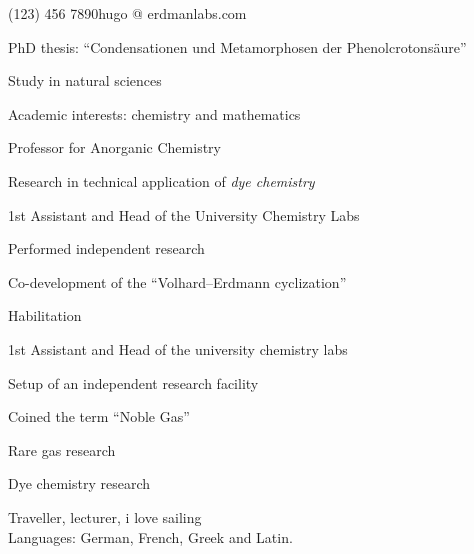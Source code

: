 \documentclass{edelgas-resume}
\begin{document}
\namehead %
\address{Outer Example Street 123, 06110 Halle, Germany}{(123) 456 7890}{hugo @ erdmanlabs.com} %


\begin{position}{}{}
\item PhD thesis: \enquote{Condensationen und Metamorphosen der Phenolcrotonsäure}
\end{position}

\begin{position}{}{}
\item Study in natural sciences
\item Academic interests: chemistry and mathematics
\end{position}



\begin{position}{Professor for Anorganic Chemistry}{}
\item Research in technical application of \textit{dye chemistry}

\end{position}

\begin{position}{1st Assistant and Head of the University Chemistry Labs}{}
\item Performed independent research
\item Co-development of the \enquote{Volhard–Erdmann cyclization}
\item Habilitation
\end{position}



\begin{position}{1st Assistant and Head of the university chemistry labs}{}
\item Setup of an independent research facility
\item Coined the term \enquote{Noble Gas}
\item Rare gas research
\item Dye chemistry research
\end{position}

\vspace{-1em}
Traveller, lecturer, i love sailing\\
Languages: German, French, Greek and Latin.
\end{document}
